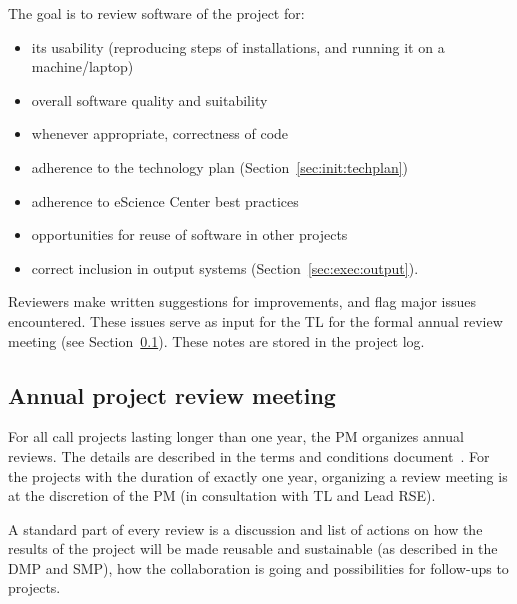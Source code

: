 The goal is to review software of the project for:
\begin{itemize}
\item its usability (reproducing steps of installations, and running it on a machine/laptop)
\item overall software quality and suitability
\item whenever appropriate, correctness of code
\item adherence to the technology plan (Section~\ref{sec:init:techplan})
\item adherence to eScience Center best practices
\item opportunities for reuse of software in other projects
\item correct inclusion in output systems (Section~\ref{sec:exec:output}).
\end{itemize}

Reviewers make written suggestions for improvements, and flag major issues encountered. These issues serve as input for
the TL for the formal annual review meeting (see Section~\ref{sec:exec:annual}). These notes are stored in the project log. 

\subsection{Annual project review meeting}
\label{sec:exec:annual}
For all call projects lasting longer than one year, the PM organizes annual reviews. The details are described in the
terms and conditions document~\cite{nlesc-terms}. For the projects with the
duration of exactly one year, organizing a review meeting is at the discretion of the PM (in consultation with TL and
Lead RSE). 

A standard part of every review is a discussion and list of actions on how the results of the project will be made
reusable and sustainable (as described in the DMP and SMP), how the collaboration is going and possibilities for
follow-ups to projects.


\let\myhcolw\relax %
\newlength{\myhcolw}
\setlength{\myhcolw}{0.75\textwidth}

